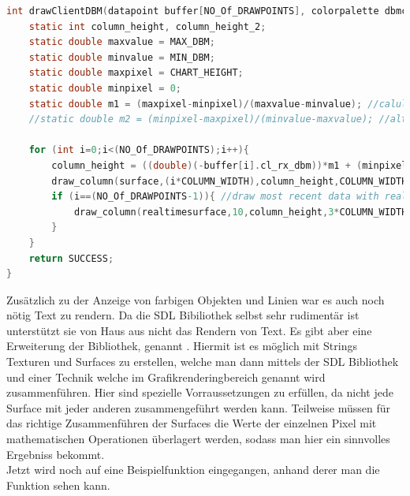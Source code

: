 \begin{lstlisting}[caption={Codeausschnitt - Zeichnen der Signalstärkekerzen},captionpos=b,language=C,breaklines]
int drawClientDBM(datapoint buffer[NO_Of_DRAWPOINTS], colorpalette dbmcolors,SDL_Surface * surface,SDL_Surface * realtimesurface){
    static int column_height, column_height_2;
    static double maxvalue = MAX_DBM;
    static double minvalue = MIN_DBM;
    static double maxpixel = CHART_HEIGHT;
    static double minpixel = 0; 
    static double m1 = (maxpixel-minpixel)/(maxvalue-minvalue); //calulate pixelheight dynamically
    //static double m2 = (minpixel-maxpixel)/(minvalue-maxvalue); //alternative function to calculate pixelheight

    for (int i=0;i<(NO_Of_DRAWPOINTS);i++){
        column_height = ((double)(-buffer[i].cl_rx_dbm))*m1 + (minpixel - m1 * minvalue) - minpixel;
        draw_column(surface,(i*COLUMN_WIDTH),column_height,COLUMN_WIDTH,(int)minpixel,0, dbmcolors.giveColor(buffer[i].cl_rx_dbm));
        if (i==(NO_Of_DRAWPOINTS-1)){ //draw most recent data with realtime column to realtime surface
            draw_column(realtimesurface,10,column_height,3*COLUMN_WIDTH,(int)minpixel,0, dbmcolors.giveColor(buffer[i].cl_rx_dbm));     
        }
    }
    return SUCCESS;
}
\end{lstlisting}
Zusätzlich zu der Anzeige von farbigen Objekten und Linien war es auch noch nötig Text zu rendern. Da die SDL Bibiliothek selbst sehr rudimentär ist unterstützt sie von Haus aus nicht das Rendern von Text. Es gibt aber eine Erweiterung der Bibliothek, genannt . Hiermit ist es möglich mit Strings Texturen und Surfaces zu erstellen, welche man dann mittels der SDL Bibliothek und einer Technik welche im Grafikrenderingbereich  genannt wird zusammenführen. Hier sind spezielle Vorraussetzungen zu erfüllen, da nicht jede Surface mit jeder anderen zusammengeführt werden kann. Teilweise müssen für das richtige Zusammenführen der Surfaces die Werte der einzelnen Pixel mit mathematischen Operationen überlagert werden, sodass man hier ein sinnvolles Ergebniss bekommt. \\
Jetzt wird noch auf eine Beispielfunktion eingegangen, anhand derer man die Funktion  sehen kann.
